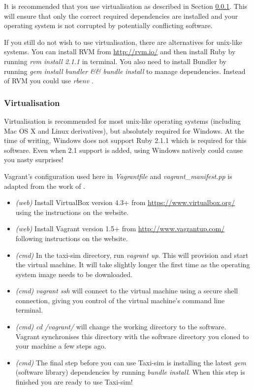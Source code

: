 It is recommended that you use virtualisation as described in Section
\ref{sec:user_manual:installation:virtualisation}. This will ensure that only
the correct required dependencies are installed and your operating system is
not corrupted by potentially conflicting software. 

If you still do not wish to use virtualisation, there are alternatives for
unix-like systems. You can install RVM \parencite{Rvm} from
\url{http://rvm.io/} and then install Ruby by running \textit{rvm install
2.1.1} in terminal. You also need to install Bundler \parencite{Bundler} by
running \textit{gem install bundler \&\& bundle install} to manage
dependencies. Instead of RVM you could use \textit{rbenv} \parencite{Rbenv}.


\subsubsection{Virtualisation}
\label{sec:user_manual:installation:virtualisation}

Virtualisation is recommended for most unix-like operating systems (including
Mac OS X and Linux derivatives), but absolutely required for Windows. At the
time of writing, Windows does not support Ruby 2.1.1 which is required for this
software. Even when 2.1 support is added, using Windows natively could cause
you nasty surprises!

Vagrant's configuration used here in \textit{Vagrantfile} and
\textit{vagrant\_manifest.pp} is adapted from the work of
\textcite{Rails+dev+box}.

\begin{itemize}
  \item \textit{(web)} Install VirtualBox version 4.3+ \parencite{Virtualbox}
        from \url{https://www.virtualbox.org/} using the instructions on the
        website.
  \item \textit{(web)} Install Vagrant version 1.5+ \parencite{Vagrant} from 
        \url{http://www.vagrantup.com/} following instructions on the website.
  \item \textit{(cmd)} In the taxi-sim directory, run \textit{vagrant up}. This
        will provision and start the virtual machine. It will take slightly
        longer the first time as the operating system image needs to be
        downloaded.
  \item \textit{(cmd)} \textit{vagrant ssh} will connect to the virtual machine 
        using a secure shell connection, giving you control of the virtual
        machine's command line terminal.
  \item \textit{(cmd)} \textit{cd /vagrant/} will change the working
        directory to the software. Vagrant synchronises this directory with the
        software directory you cloned to your machine a few steps ago.
  \item \textit{(cmd)} The final step before you can use Taxi-sim is installing
        the latest \textit{gem} (software library) dependencies by running 
        \textit{bundle install}. When this step is finished you are ready to
        use Taxi-sim!
\end{itemize}


